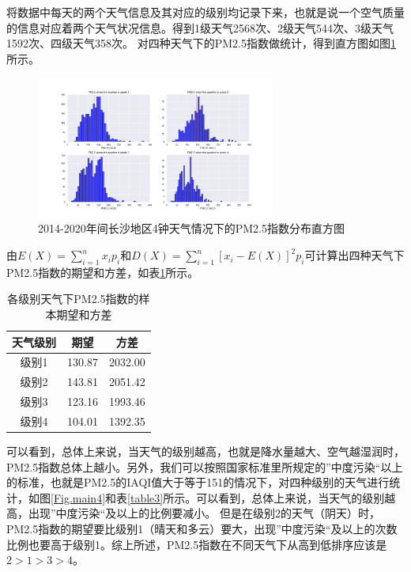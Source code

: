 \documentclass[UTF8,a4paper,10pt]{article}
\begin{document}
\indent 将数据中每天的两个天气信息及其对应的级别均记录下来，也就是说一个空气质量的信息对应着两个天气状况信息。得到1级天气2568次、2级天气544次、3级天气1592次、四级天气358次。
\newpage 对四种天气下的PM2.5指数做统计，得到直方图如图\ref{Fig.main3}所示。

\begin{figure}[H] %
\centering %
\includegraphics[width=0.7\textwidth]{fig//pm25-weather.png} %
\caption{2014-2020年间长沙地区4钟天气情况下的PM2.5指数分布直方图} %
\label{Fig.main3} %
\end{figure}

\indent 由$E(X)=\sum_{i=1}^{n} x_{i} p_{i}$和$D(X)=\sum_{i=1}^{n}\left[x_{i}-E(X)\right]^{2} p_{i}$可计算出四种天气下PM2.5指数的期望和方差，如表\ref{table2}所示。

\begin{table}[]
    \caption{各级别天气下PM2.5指数的样本期望和方差}
    \vspace{20pt}
    \centering
    \begin{tabular}{ccc}
        \toprule  %
        天气级别& 期望& 方差\\
        \midrule  %
        级别1& 130.87& 2032.00\\
        级别2& 143.81& 2051.42\\
        级别3& 123.16& 1993.46\\
        级别4& 104.01& 1392.35\\
        \bottomrule %
    \end{tabular}
    \label{table2}
\end{table}

\newpage \indent 可以看到，总体上来说，当天气的级别越高，也就是降水量越大、空气越湿润时，PM2.5指数总体上越小。另外，我们可以按照国家标准\supercite{ref5}里所规定的”中度污染“以上的标准，也就是PM2.5的IAQI值大于等于151的情况下，对四种级别的天气进行统计，如图\ref{Fig.main4}和表\ref{table3}所示。可以看到，总体上来说，当天气的级别越高，出现”中度污染“及以上的比例要减小。
\indent 但是在级别2的天气（阴天）时，PM2.5指数的期望要比级别1（晴天和多云）要大，出现”中度污染“及以上的次数比例也要高于级别1。综上所述，PM2.5指数在不同天气下从高到低排序应该是$2>1>3>4$。
\end{document}
